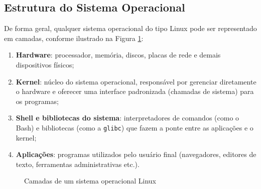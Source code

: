 \documentclass[a4paper,12pt]{article}
\begin{document}
\subsection{Estrutura do Sistema Operacional}

De forma geral, qualquer sistema operacional do tipo Linux pode ser
representado em camadas, conforme ilustrado na Figura \ref{fig:camadas}:

\begin{enumerate}
    \item \textbf{Hardware}: processador, memória, discos, placas de rede
          e demais dispositivos físicos;
    \item \textbf{Kernel}: núcleo do sistema operacional, responsável por
          gerenciar diretamente o hardware e oferecer uma interface
          padronizada (chamadas de sistema) para os programas;
    \item \textbf{Shell e bibliotecas do sistema}: interpretadores de
          comandos (como o Bash) e bibliotecas (como a \texttt{glibc}) que
          fazem a ponte entre as aplicações e o kernel;
    \item \textbf{Aplicações}: programas utilizados pelo usuário final
          (navegadores, editores de texto, ferramentas administrativas
          etc.).
\end{enumerate}

\begin{figure}[h]
    \centering
    \caption{Camadas de um sistema operacional Linux}
    \label{fig:camadas}
\end{figure}
\end{document}
